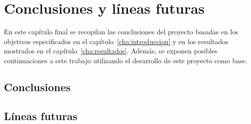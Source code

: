 %
%
%
% 
%
%
%
%

\chapter{Conclusiones y líneas futuras}\label{cha:concl-y-line}

En este capítulo final se recopilan las conclusiones del proyecto basadas en los objetivos especificados en el capítulo~\ref{cha:introduccion} y en los resultados mostrados en el capítulo~\ref{cha:resultados}.
Además, se exponen posibles continuaciones a este trabajo utilizando el desarrollo de este proyecto como base.


\section{Conclusiones}\label{sec:conclusiones}



\section{Líneas futuras}\label{sec:lineas-futuras}





